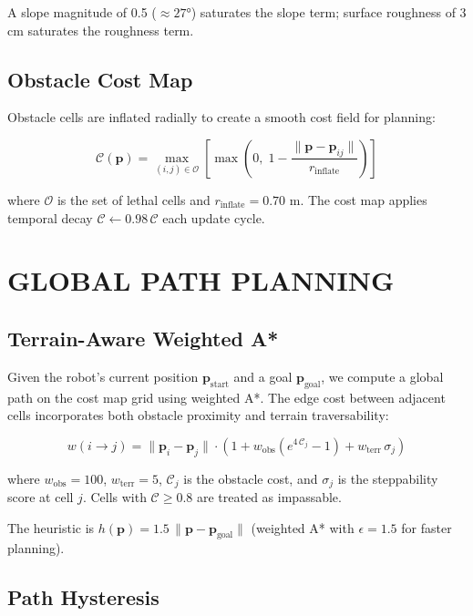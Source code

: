 \documentclass[11pt,a4paper]{article}
\begin{document}
A slope magnitude of 0.5 ($\approx 27°$) saturates the slope term; surface roughness of 3 cm saturates the roughness term.

\subsection{Obstacle Cost Map}

Obstacle cells are inflated radially to create a smooth cost field for planning:

\begin{equation}
\mathcal{C}(\mathbf{p}) = \max_{(i,j) \in \mathcal{O}} \left[ \max\!\left(0,\; 1 - \frac{\|\mathbf{p} - \mathbf{p}_{ij}\|}{r_{\text{inflate}}}\right) \right]
\end{equation}

where $\mathcal{O}$ is the set of lethal cells and $r_{\text{inflate}} = 0.70$ m. The cost map applies temporal decay $\mathcal{C} \leftarrow 0.98\,\mathcal{C}$ each update cycle.

\section{GLOBAL PATH PLANNING}

\subsection{Terrain-Aware Weighted A*}

Given the robot's current position $\mathbf{p}_{\text{start}}$ and a goal $\mathbf{p}_{\text{goal}}$, we compute a global path on the cost map grid using weighted A*. The edge cost between adjacent cells incorporates both obstacle proximity and terrain traversability:

\begin{equation}
w(i \to j) = \|\mathbf{p}_i - \mathbf{p}_j\| \cdot \left(1 + w_{\text{obs}}\left(e^{4\,\mathcal{C}_j} - 1\right) + w_{\text{terr}}\,\sigma_j\right)
\end{equation}

where $w_{\text{obs}} = 100$, $w_{\text{terr}} = 5$, $\mathcal{C}_j$ is the obstacle cost, and $\sigma_j$ is the steppability score at cell $j$. Cells with $\mathcal{C} \geq 0.8$ are treated as impassable.

The heuristic is $h(\mathbf{p}) = 1.5\,\|\mathbf{p} - \mathbf{p}_{\text{goal}}\|$ (weighted A* with $\epsilon = 1.5$ for faster planning).

\subsection{Path Hysteresis}
\end{document}
